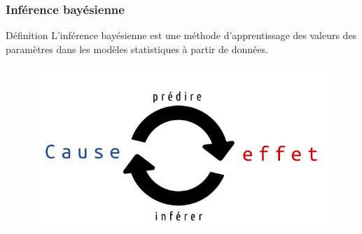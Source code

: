 \documentclass[aspectratio=169,professionalfonts, 12pt]{beamer}
\begin{document}
\begin{frame}
  \frametitle{Inférence bayésienne}
  \begin{minipage}{0.4\textwidth}
    \begin{block}{Définition}
      L’inférence bayésienne est une méthode d’apprentissage des valeurs des paramètres dans les modèles statistiques à partir de données. 
    \end{block}
  \end{minipage}
  \begin{minipage}{2cm}
  
  \end{minipage}
  \begin{minipage}{0.5\textwidth}
    \begin{figure}[t]
    \begin{center}
      \includegraphics[width=\textwidth]{images/etat_art/predire_inferer.png}
    \end{center}
    \end{figure} 
  \end{minipage}	
\end{frame}
\end{document}
